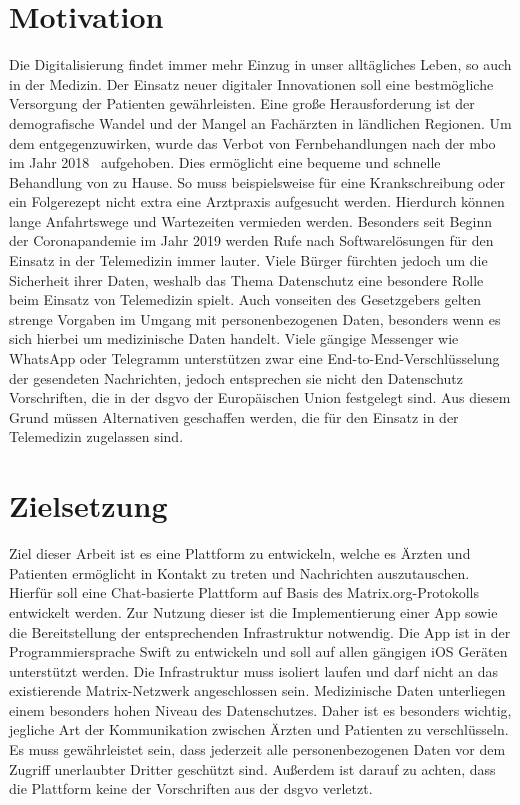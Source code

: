     \section{Motivation}\label{sec:motivation}
    Die Digitalisierung findet immer mehr Einzug in unser alltägliches Leben, so auch in der Medizin.
    Der Einsatz neuer digitaler Innovationen soll eine bestmögliche Versorgung der Patienten gewährleisten.
    Eine große Herausforderung ist der demografische Wandel und der Mangel an Fachärzten in ländlichen Regionen.
    Um dem entgegenzuwirken, wurde das Verbot von Fernbehandlungen nach der \ac{mbo} im Jahr 2018~\cite{beschlussprotokol} aufgehoben.
    Dies ermöglicht eine bequeme und schnelle Behandlung von zu Hause.
    So muss beispielsweise für eine Krankschreibung oder ein Folgerezept nicht extra eine Arztpraxis aufgesucht werden.
    Hierdurch können lange Anfahrtswege und Wartezeiten vermieden werden.
    Besonders seit Beginn der Coronapandemie im Jahr 2019 werden Rufe nach Softwarelösungen für den Einsatz in der Telemedizin immer lauter.
    Viele Bürger fürchten jedoch um die Sicherheit ihrer Daten, weshalb das Thema Datenschutz eine besondere Rolle beim Einsatz von Telemedizin spielt.
    Auch vonseiten des Gesetzgebers gelten strenge Vorgaben im Umgang mit personenbezogenen Daten, besonders wenn es sich hierbei um medizinische Daten handelt.
    Viele gängige Messenger wie WhatsApp oder Telegramm unterstützen zwar eine End-to-End-Verschlüsselung der gesendeten Nachrichten, jedoch entsprechen sie nicht den Datenschutz Vorschriften, die in der \ac{dsgvo} der Europäischen Union festgelegt sind.
    Aus diesem Grund müssen Alternativen geschaffen werden, die für den Einsatz in der Telemedizin zugelassen sind.

    \newpage
    \section{Zielsetzung}\label{sec:zielsetzung}
    Ziel dieser Arbeit ist es eine Plattform zu entwickeln, welche es Ärzten und Patienten ermöglicht in Kontakt zu treten und Nachrichten auszutauschen.
    Hierfür soll eine Chat-basierte Plattform auf Basis des Matrix.org-Protokolls entwickelt werden.
    Zur Nutzung dieser ist die Implementierung einer App sowie die Bereitstellung der entsprechenden Infrastruktur notwendig.
    Die App ist in der Programmiersprache Swift zu entwickeln und soll auf allen gängigen iOS Geräten unterstützt werden.
    Die Infrastruktur muss isoliert laufen und darf nicht an das existierende Matrix-Netzwerk angeschlossen sein.
    Medizinische Daten unterliegen einem besonders hohen Niveau des Datenschutzes.
    Daher ist es besonders wichtig, jegliche Art der Kommunikation zwischen Ärzten und Patienten zu verschlüsseln.
    Es muss gewährleistet sein, dass jederzeit alle personenbezogenen Daten vor dem Zugriff unerlaubter Dritter geschützt sind.
    Außerdem ist darauf zu achten, dass die Plattform keine der Vorschriften aus der \ac{dsgvo} verletzt.

